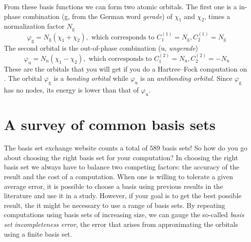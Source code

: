 \documentclass[../Main/notes.tex]{subfiles}
\begin{document}
From these basis functions we can form two atomic orbitals.
The first one is a in-phase combination (g, from the German word \textit{gerade}) of $\chi_1$ and $\chi_2$, times a normalization factor $N_\mathrm{g}$
\begin{equation}
\varphi_\mathrm{g} = N_\mathrm{g} (\chi_\mathrm{1} + \chi_\mathrm{2}), \text{ which corresponds to }
C_1^{(1)} =  N_\mathrm{g}, C_2^{(1)} =  N_\mathrm{g}
\end{equation}
The second orbital is the out-of-phase combination (u, \textit{ungerade})
\begin{equation}
\varphi_\mathrm{u} = N_\mathrm{u} (\chi_\mathrm{1} - \chi_\mathrm{2}), \text{ which corresponds to }
C_1^{(2)} =  N_\mathrm{u}, C_2^{(2)} = -N_\mathrm{u}
\end{equation}
These are the orbitals that you will get if you do a Hartree--Fock computation on .
The orbital $\varphi_\mathrm{g}$ is a \emph{bonding orbital} while $\varphi_\mathrm{u}$ is an \emph{antibonding orbital}.
Since $\varphi_\mathrm{g}$ has no nodes, its energy is lower than that of $\varphi_\mathrm{u}$.


%
%




\section{A survey of common basis sets}

The basis set exchange website counts a total of 589 basis sets!
So how do you go about choosing the right basis set for your computation?
In choosing the right basis set we always have to balance two competing factors: the accuracy of the result and the cost of a computation.
When one is willing to tolerate a given average error, it is possible to choose a basis using previous results in the literature and use it in a study.
However, if your goal is to get the best possible result, the it might be necessary to use a range of basis sets.
By repeating computations using basis sets of increasing size, we can gauge the so-called \emph{basis set incompleteness error}, the error that arises from approximating the orbitals using a finite basis set.
\end{document}
